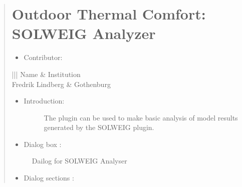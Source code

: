 \documentclass[letterpaper,10pt,english]{sphinxmanual}
\begin{document}
\begin{quote}
\begin{itemize}
\begin{description}
\begin{itemize}
\end{itemize}

\end{description}

\end{itemize}


\section{Outdoor Thermal Comfort: SOLWEIG Analyzer}
\label{\detokenize{post_processor/Outdoor Thermal Comfort SOLWEIG Analyzer:outdoor-thermal-comfort-solweig-analyzer}}\label{\detokenize{post_processor/Outdoor Thermal Comfort SOLWEIG Analyzer:solweiganalyzer}}\label{\detokenize{post_processor/Outdoor Thermal Comfort SOLWEIG Analyzer::doc}}\begin{itemize}
\item {} 
Contributor:

\end{itemize}


\begin{savenotes}\sphinxattablestart
\centering
\begin{tabular}[t]{|||}
\hline
\sphinxstyletheadfamily 
Name
&\sphinxstyletheadfamily 
Institution
\\
\hline
Fredrik Lindberg
&
Gothenburg
\\
\hline
\end{tabular}
\par
\sphinxattableend\end{savenotes}
\begin{itemize}
\item {} \begin{description}
\item[{Introduction:}] \leavevmode
The  plugin can be used to make basic analysis of model results generated by the SOLWEIG plugin.

\end{description}

\item {} 
Dialog box  :

\end{itemize}

\begin{figure}[htbp]
\centering
\capstart

\noindent{}
\caption{Dailog for SOLWEIG Analyser}\label{\detokenize{post_processor/Outdoor Thermal Comfort SOLWEIG Analyzer:id1}}\end{figure}
\begin{itemize}
\item {} 
Dialog sections  :


\end{itemize}
\end{quote}
\end{document}
